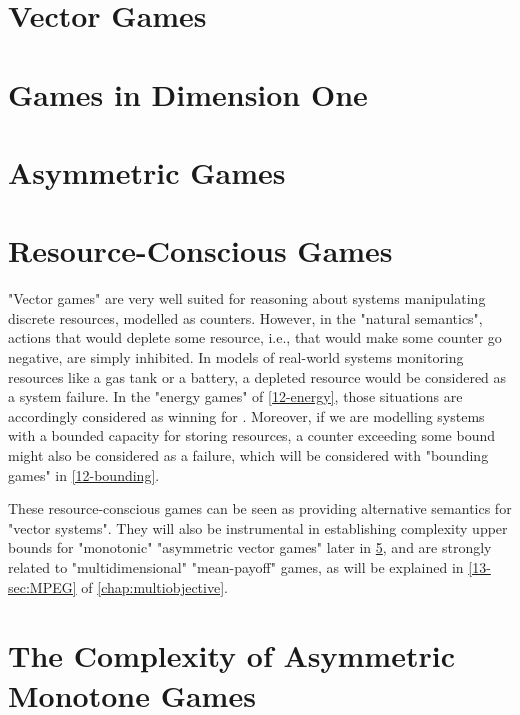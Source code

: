 




\ifstandalone
{}
\tableofcontents
\fi

\section{Vector Games}
\label{12-counters}


\section{Games in Dimension One}
\label{12-dim1}


\section{Asymmetric Games}
\label{12-avag}


\section{Resource-Conscious Games}
\label{12-resource}
"Vector games" are very well suited for reasoning about systems
manipulating discrete resources, modelled as counters.  However, in
the "natural semantics", actions that would deplete some resource,
i.e., that would make some counter go negative, are simply inhibited.
In models of real-world systems monitoring resources like a gas
tank or a battery, a depleted resource would be considered as a system
failure.  In the "energy games" of \cref{12-energy}, those situations
are accordingly considered as winning for \Adam.  Moreover, if we are
modelling systems with a bounded capacity for storing resources, a
counter exceeding some bound might also be considered as a failure,
which will be considered with "bounding games" in \cref{12-bounding}.

These resource-conscious games can be seen as providing alternative
semantics for "vector systems".  They will also be instrumental in
establishing complexity upper bounds for "monotonic" "asymmetric vector
games" later in \cref{12-complexity}, and are strongly related to
"multidimensional" "mean-payoff" games, as will be explained in
\cref{13-sec:MPEG} of \cref{chap:multiobjective}.


%


\section{The Complexity of Asymmetric Monotone Games}
\label{12-complexity}

